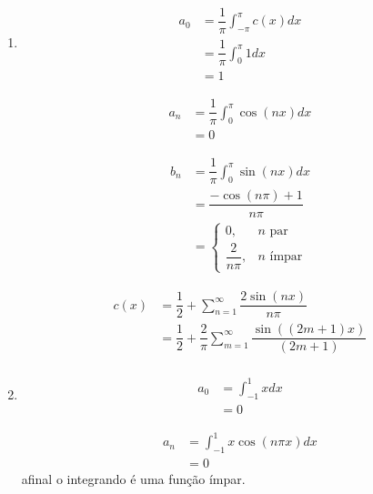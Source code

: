 \documentclass{article}
\begin{document}
\begin{enumerate}
\begin{enumerate}
                    \item
                        \begin{align*}
                            a_0 &= \dfrac{1}{\pi} \int_{-\pi}^{\pi}c(x)dx \\
                            &= \dfrac{1}{\pi} \int_{0}^{\pi} 1 dx \\
                            &= 1
                        \end{align*}

                        \begin{align*}
                            a_n &= \dfrac{1}{\pi} \int_{0}^{\pi} \cos(nx) dx \\
                            &= 0
                        \end{align*}

                        \begin{align*}
                            b_n &= \dfrac{1}{\pi} \int_{0}^{\pi} \sin(nx) dx \\
                            &= \dfrac{-\cos(n\pi)+1}{n\pi} \\
                            &= \begin{cases}
                                0, &n \text{ par} \\
                                \dfrac{2}{n\pi}, &n \text{ ímpar}
                            \end{cases}
                        \end{align*}

                        \begin{align*}
                            c(x) &= \dfrac{1}{2} + \sum_{n=1}^\infty \dfrac{2\sin(nx)}{n\pi} \\
                            &= \dfrac{1}{2} + \dfrac{2}{\pi}\sum_{m=1}^\infty \dfrac{\sin((2m+1)x)}{(2m+1)} \\
                        \end{align*}

                    \item
                        \begin{align*}
                            a_0 &= \int_{-1}^{1}x dx \\
                            &= 0
                        \end{align*}
                        
                        \begin{align*}
                            a_n &= \int_{-1}^{1} x\cos(n\pi x) dx \\
                            &= 0
                        \end{align*}
                        afinal o integrando é uma função ímpar.


\end{enumerate}
\end{enumerate}
\end{document}
